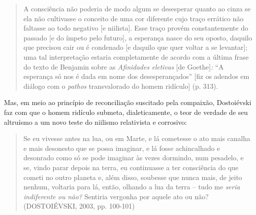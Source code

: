 \begin{quote}
A consciência não poderia de modo algum se desesperar quanto ao cinza se
ela não cultivasse o conceito de uma cor diferente cujo traço errático
não faltasse ao todo negativo {[}e niilista{]}. Esse traço provém
constantemente do passado {[}e do ímpeto pelo futuro{]}, a esperança
nasce do seu oposto, daquilo que precisou cair ou é condenado {[}e
daquilo que quer voltar a se levantar{]}; uma tal interpretação estaria
completamente de acordo com a última frase do texto de Benjamin sobre as
\emph{Afinidades eletivas} {[}de Goethe{]}\emph{:} ``A esperança só nos
é dada em nome dos desesperançados'' {[}fiz os adendos em diálogo com o
\emph{pathos} transvalorado do homem ridículo{]} (p. 313).
\end{quote}

Mas, em meio ao princípio de reconciliação suscitado pela compaixão,
Dostoiévski faz com que o homem ridículo submeta, dialeticamente, o teor
de verdade de seu altruísmo a um novo teste do niilismo relativista e
corrosivo:

\begin{quote}
Se eu vivesse antes na lua, ou em Marte, e lá cometesse o ato mais
canalha e mais desonesto que se possa imaginar, e lá fosse achincalhado
e desonrado como só se pode imaginar às vezes dormindo, num pesadelo, e
se, vindo parar depois na terra, eu continuasse a ter consciência do que
cometi no outro planeta e, além disso, soubesse que nunca mais, de jeito
nenhum, voltaria para lá, então, olhando a lua da terra -- tudo me
\emph{seria indiferente ou não?} Sentiria vergonha por aquele ato ou
não? (DOSTOIÉVSKI, 2003, pp. 100-101)
\end{quote}

